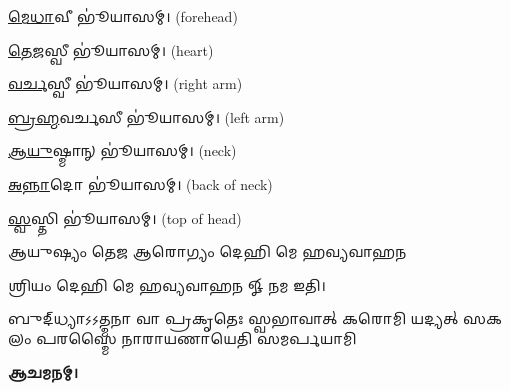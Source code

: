  \ul{𑌮𑍇}\ul{𑌧𑌾}𑌵𑍀 𑌭𑍂॑𑌯𑌾𑌸𑌮𑍍। (forehead)
 
 \ul{𑌤𑍇}\ul{𑌜}𑌸𑍍𑌵𑍀 𑌭𑍂॑𑌯𑌾𑌸𑌮𑍍। (heart)
 
 \ul{𑌵}\ul{𑌰𑍍𑌚}𑌸𑍍𑌵𑍀 𑌭𑍂॑𑌯𑌾𑌸𑌮𑍍। (right arm)
 
 \ul{𑌬𑍍𑌰}\ul{𑌹𑍍𑌮}𑌵𑌰𑍍𑌚𑌸𑍀 𑌭𑍂॑𑌯𑌾𑌸𑌮𑍍। (left arm)
 
 \ul{𑌆}\ul{𑌯𑍁}𑌷𑍍𑌮𑌾𑌨𑍍 𑌭𑍂॑𑌯𑌾𑌸𑌮𑍍। (neck)
 
 \ul{𑌅}\ul{𑌨𑍍𑌨𑌾}𑌦𑍋 𑌭𑍂॑𑌯𑌾𑌸𑌮𑍍। (back of neck)
 
 \ul{𑌸𑍍𑌵}𑌸𑍍𑌤𑌿 𑌭𑍂॑𑌯𑌾𑌸𑌮𑍍। (top of head)
 
 
{𑌆𑌯𑍁𑌷𑍍𑌯𑌂 𑌤𑍇𑌜 𑌆𑌰𑍋𑌗𑍍𑌯𑌂 𑌦𑍇𑌹𑌿 𑌮𑍇 𑌹𑌵𑍍𑌯𑌵𑌾𑌹𑌨}
 
𑌶𑍍𑌰𑌿𑌯𑌂 𑌦𑍇𑌹𑌿 𑌮𑍇 𑌹𑌵𑍍𑌯𑌵𑌾𑌹𑌨 𑍐 𑌨𑌮 𑌇𑌤𑌿।

{𑌬𑍁𑌦𑍍‌𑌧𑍍𑌯𑌾𑌽𑌽𑌤𑍍𑌮𑌨𑌾 𑌵𑌾 𑌪𑍍𑌰𑌕𑍃𑌤𑍇𑌃 𑌸𑍍𑌵𑌭𑌾𑌵𑌾𑌤𑍍}
{𑌕𑌰𑍋𑌮𑌿 𑌯𑌦𑍍𑌯𑌤𑍍 𑌸𑌕𑌲𑌂 𑌪𑌰𑌸𑍍𑌮𑍈}
{𑌨𑌾𑌰𑌾𑌯𑌣𑌾𑌯𑍇𑌤𑌿 𑌸𑌮𑌰𑍍𑌪𑌯𑌾𑌮𑌿}

\textbf{𑌆𑌚𑌮𑌨𑌮𑍍।}


 
